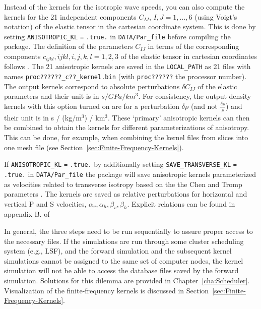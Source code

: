 \begin{enumerate}
Instead of the kernels for the isotropic wave speeds, you can also
compute the kernels for the 21 independent components $C_{IJ},\, I,J=1,...,6$
(using Voigt's notation) of the elastic tensor in the cartesian coordinate
system. This is done by setting \texttt{ANISOTROPIC\_KL} \texttt{=}
\texttt{.true.} in \texttt{DATA/Par\_file} before compiling the package.
The definition of the parameters $C_{IJ}$ in terms of the corresponding
components $c_{ijkl},ijkl,i,j,k,l=1,2,3$ of the elastic tensor in
cartesian coordinates follows \citet{ChTr07}. The 21 anisotropic
kernels are saved in the \texttt{LOCAL\_PATH} as 21 files with names
\texttt{proc??????\_c??\_kernel.bin} (with \texttt{proc??????}
the processor number). The output kernels correspond to absolute perturbations
$\delta C_{IJ}$ of the elastic parameters and their unit is in $s/GPa/km^{3}$.
For consistency, the output density kernels with this option turned
on are for a perturbation $\delta\rho$ (and not $\frac{\delta\rho}{\rho}$)
and their unit is in s / (kg/m$^{3}$) / km$^{3}$. These `primary'
anisotropic kernels can then be combined to obtain the kernels for
different parameterizations of anisotropy. This can be done, for example,
when combining the kernel files from slices into one mesh file (see
Section~\ref{sec:Finite-Frequency-Kernels}).\newline


If \texttt{ANISOTROPIC\_KL} \texttt{=} \texttt{.true.} by additionally
setting \texttt{SAVE\_TRANSVERSE\_KL} \texttt{=} \texttt{.true.} in \texttt{DATA/Par\_file}
the package will save anisotropic kernels parameterized as velocities
related to transverse isotropy based on the the Chen and Tromp parameters
\citet{ChTr07}. The kernels are saved as relative perturbations for
horizontal and vertical P and S velocities, $\alpha_{v},\alpha_{h},\beta_{v},\beta_{h}$.
Explicit relations can be found in appendix B. of \citet{SiLiTrTr07b}\newline


\end{enumerate}

In general, the three steps need to be run sequentially to assure
proper access to the necessary files. If the simulations are run through
some cluster scheduling system (e.g., LSF), and the forward simulation
and the subsequent kernel simulations cannot be assigned to the same
set of computer nodes, the kernel simulation will not be able to access
the database files saved by the forward simulation. Solutions for
this dilemma are provided in Chapter~\ref{cha:Scheduler}. Visualization
of the finite-frequency kernels is discussed in Section~\ref{sec:Finite-Frequency-Kernels}.

